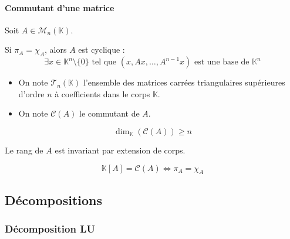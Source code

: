   \paragraph{Commutant d'une matrice}
  
  Soit $A \in \mathcal{M}_n(\mathbb{K})$.
  
  
  \begin{lemma}
    Si $\pi_A = \chi_A$, alors $A$ est cyclique :
    \[ \exists x \in \mathbb{K}^n \setminus \{ 0 \} \text{ tel que } (x, Ax, \dots, A^{n-1}x) \text{ est une base de } \mathbb{K}^n \]
  \end{lemma}
  
  
  \begin{notation}
    \begin{itemize}
      \item On note $\mathcal{T}_n(\mathbb{K})$ l'ensemble des matrices carrées triangulaires supérieures d'ordre $n$ à coefficients dans le corps $\mathbb{K}$.
      \item On note $\mathcal{C}(A)$ le commutant de $A$.
    \end{itemize}
  \end{notation}
  
  \begin{lemma}
    \[ \dim_{\mathbb{K}}(\mathcal{C}(A)) \geq n \]
  \end{lemma}
  
  \begin{lemma}
    Le rang de $A$ est invariant par extension de corps.
  \end{lemma}
  
  
  \begin{theorem}
    \[ \mathbb{K}[A] = \mathcal{C}(A) \iff \pi_A = \chi_A \]
  \end{theorem}
  
  \subsection{Décompositions}
  
  \subsubsection{Décomposition LU}
  
  
